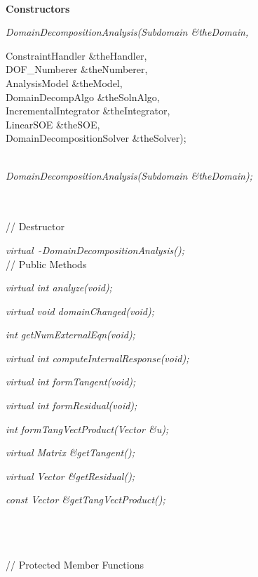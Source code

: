  \\
{\bf Constructors} 

{\em DomainDecompositionAnalysis(Subdomain \&theDomain, 

\indent\indent\indent\indent\indent\indent\indent ConstraintHandler
\&theHandler, \\ 
\indent\indent\indent\indent\indent\indent\indent DOF\_Numberer \&theNumberer, \\
\indent\indent\indent\indent\indent\indent\indent AnalysisModel \&theModel,\\
\indent\indent\indent\indent\indent\indent\indent DomainDecompAlgo \&theSolnAlgo,\\
\indent\indent\indent\indent\indent\indent\indent IncrementalIntegrator \&theIntegrator,\\
\indent\indent\indent\indent\indent\indent\indent LinearSOE \&theSOE, \\
\indent\indent\indent\indent\indent\indent\indent DomainDecompositionSolver \&theSolver);} \\
{\em DomainDecompositionAnalysis(Subdomain \&theDomain);} 

\\ \\
// Destructor 

{\em virtual~ $\tilde{}$DomainDecompositionAnalysis();}\\ 

// Public Methods 

{\em virtual int analyze(void);} 

{\em virtual void domainChanged(void);} 

{\em int getNumExternalEqn(void);} 

{\em     virtual int  computeInternalResponse(void);}

{\em     virtual int  formTangent(void);}

{\em     virtual int  formResidual(void);}

{\em int  formTangVectProduct(Vector \&u);}

{\em virtual Matrix \&getTangent();}

{\em virtual Vector \&getResidual();}

{\em const Vector \&getTangVectProduct();}

\\ 
\\\\ 
// Protected Member Functions  

